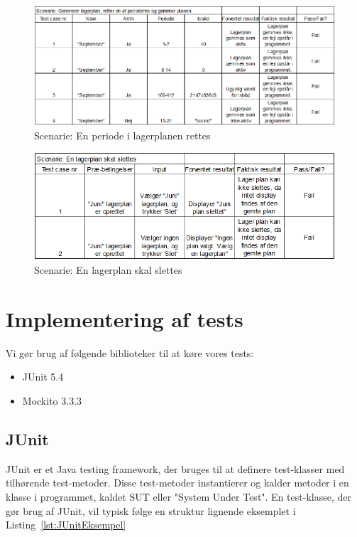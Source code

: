 \begin{figure}[p]
    \centering
    \includegraphics[width=0.8\hsize]{figures/tests/test_ret_plan.png}
    \caption{Scenarie: En periode i lagerplanen rettes}
    \label{fig:testdelete}
\end{figure}


\begin{figure}[p]
    \centering
    \includegraphics[width=0.8\hsize]{figures/tests/test_slet_lagerplan.png}
    \caption{Scenarie: En lagerplan skal slettes}
    \label{fig:testdelete}
\end{figure}



\section{Implementering af tests}
Vi gør brug af følgende biblioteker til at køre vores tests:
\begin{itemize}
    \item JUnit 5.4
    \item Mockito 3.3.3
\end{itemize}

\subsection{JUnit}
JUnit er et Java testing framework, der bruges til at definere test-klasser med tilhørende test-metoder. Disse test-metoder instantierer og kalder metoder i en klasse i programmet, kaldet SUT eller "System Under Test". En test-klasse, der gør brug af JUnit, vil typisk følge en struktur lignende eksemplet i Listing~\ref{lst:JUnitEksempel}

